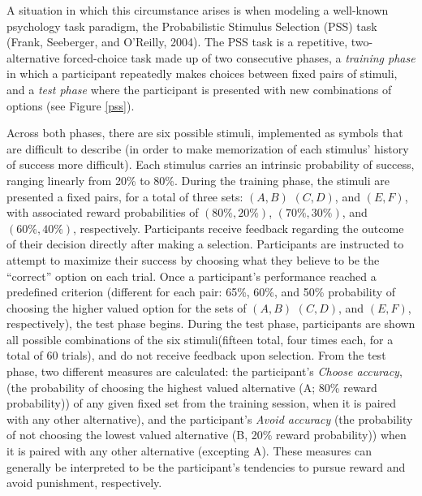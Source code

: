 \documentclass[10pt,letterpaper]{article}
\begin{document}
A situation in which this circumstance arises is when modeling a well-known psychology task paradigm, the Probabilistic Stimulus Selection (PSS) task (Frank, Seeberger, and O'Reilly, 2004). The PSS task is a repetitive, two-alternative forced-choice task made up of two consecutive phases, a \emph{training phase} in which a participant repeatedly makes choices between fixed pairs of stimuli, and a \emph{test phase} where the participant is presented with new combinations of options (see Figure \ref{pss}).

Across both phases, there are six possible stimuli, implemented as symbols that are difficult to describe (in order to make memorization of each stimulus’ history of success more difficult). Each stimulus carries an intrinsic probability of success, ranging linearly from 20\% to 80\%. During the training phase, the stimuli are presented a fixed pairs, for a total of three sets: $(A, B)$  $(C,D)$, and $(E, F)$, with associated reward probabilities of $(80\%, 20\%)$, $(70\%, 30\%)$, and $(60\%, 40\%)$, respectively. Participants receive feedback regarding the outcome of their decision directly after making a selection. Participants are instructed to attempt to maximize their success by choosing what they believe to be the ``correct'' option on each trial. Once a participant’s performance reached a predefined criterion (different for each pair: 65\%, 60\%, and 50\% probability of choosing the higher valued option for the sets of $(A, B)$  $(C,D)$, and $(E, F)$, respectively), the test phase begins. During the test phase, participants are shown all possible combinations of the six stimuli(fifteen total, four times each, for a total of 60 trials), and do not receive feedback upon selection. From the test phase, two different measures are calculated: the participant's \emph{Choose accuracy}, (the probability of choosing the highest valued alternative (A; 80\% reward probability)) of any given fixed set from the training session, when it is paired with any other alternative), and the participant's \emph{Avoid accuracy} (the probability of not choosing the lowest valued alternative (B, 20\% reward probability)) when it is paired with any other alternative (excepting A). These measures can generally be interpreted to be the participant's tendencies to pursue reward and avoid punishment, respectively.
\end{document}
